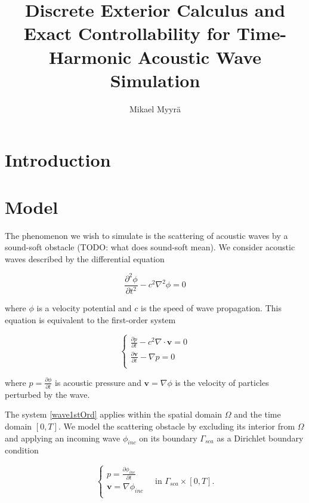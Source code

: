 \documentclass[utf8,english]{gradu3}
\title{Discrete Exterior Calculus and Exact Controllability for Time-Harmonic Acoustic Wave Simulation}
\author{Mikael Myyrä}
\begin{document}
\maketitle
\mainmatter
\sloppypar


\chapter{Introduction}



\chapter{Model}

The phenomenon we wish to simulate is the scattering
of acoustic waves by a sound-soft obstacle (TODO: what does sound-soft mean).
We consider acoustic waves described by the differential equation

\begin{equation}
  \frac{\partial^2 \phi}{\partial t^2} - c^2 \nabla^2\phi = 0
\end{equation}

where $\phi$ is a velocity potential and $c$ is the speed of wave propagation.
This equation is equivalent to the first-order system

\begin{equation}\label{wave1stOrd}
  \begin{cases}
    \frac{\partial p}{\partial t} - c^2\nabla \cdot \mathbf{v} = 0 \\
    \frac{\partial \mathbf{v}}{\partial t} - \nabla p = 0 \\
  \end{cases}
\end{equation}

where $p = \frac{\partial \phi}{\partial t}$ is acoustic pressure
and $\mathbf{v} = \nabla \phi$ is the velocity
of particles perturbed by the wave.

The system \eqref{wave1stOrd} applies within the spatial domain $\Omega$
and the time domain $[0, T]$.
We model the scattering obstacle by excluding its interior from $\Omega$
and applying an incoming wave $\phi_{inc}$ on its boundary $\Gamma_{sca}$
as a Dirichlet boundary condition

\[
  \begin{cases}
    p = \frac{\partial \phi_{inc}}{\partial t} \\
    \mathbf{v} = \nabla \phi_{inc} \\
  \end{cases}
  \quad \text{in } \Gamma_{sca} \times [0, T].
\]
\end{document}

